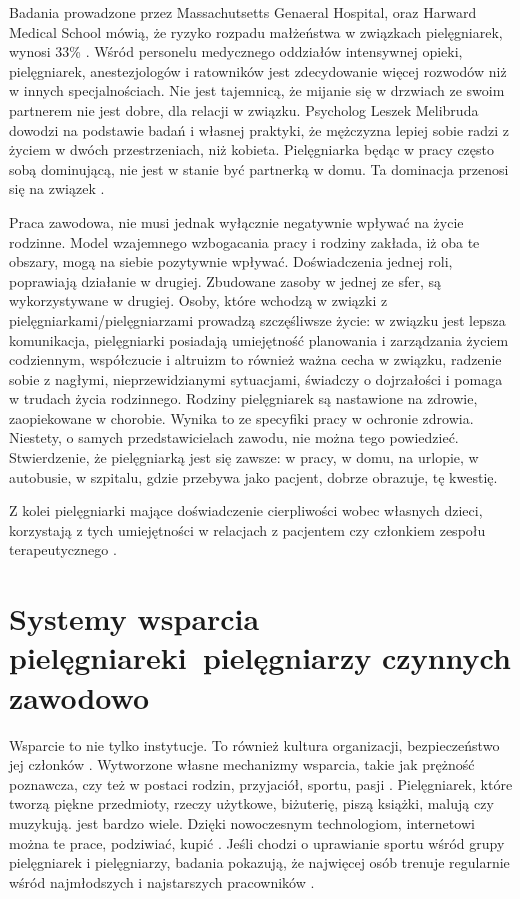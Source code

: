 \documentclass[a4paper,12pt,twoside,openright]{mwrep}
\begin{document}
Badania prowadzone przez Massachutsetts Genaeral Hospital, oraz Harward Medical School mówią, że ryzyko rozpadu małżeństwa w związkach pielęgniarek, wynosi 33\% \cite{rozwody}.  Wśród personelu medycznego oddziałów intensywnej opieki, pielęgniarek, anestezjologów i ratowników jest zdecydowanie więcej rozwodów niż w innych specjalnościach.  Nie jest tajemnicą, że mijanie się w drzwiach ze swoim partnerem nie jest dobre, dla relacji w związku. Psycholog Leszek Melibruda dowodzi na podstawie badań i własnej praktyki, że mężczyzna lepiej sobie radzi z życiem w dwóch przestrzeniach, niż kobieta. Pielęgniarka będąc w pracy często sobą dominującą, nie jest w stanie być partnerką w domu. Ta dominacja przenosi się na związek \cite{melibruda}.

Praca zawodowa, nie musi jednak wyłącznie negatywnie wpływać na życie rodzinne. Model wzajemnego wzbogacania pracy i rodziny zakłada, iż oba te obszary, mogą na siebie pozytywnie wpływać. Doświadczenia jednej roli, poprawiają działanie w drugiej. Zbudowane zasoby w jednej ze sfer, są wykorzystywane w drugiej.  Osoby, które wchodzą w związki z pielęgniarkami/pielęgniarzami prowadzą szczęśliwsze życie: w związku jest lepsza komunikacja, pielęgniarki posiadają umiejętność planowania i zarządzania życiem codziennym, współczucie i altruizm to również ważna cecha w związku, radzenie sobie z nagłymi, nieprzewidzianymi sytuacjami, świadczy o dojrzałości i pomaga w trudach życia rodzinnego. Rodziny pielęgniarek są nastawione na zdrowie, zaopiekowane w chorobie. Wynika to ze specyfiki pracy w ochronie zdrowia. Niestety, o samych przedstawicielach zawodu, nie można tego powiedzieć. Stwierdzenie, że pielęgniarką jest się zawsze: w pracy, w domu, na urlopie, w autobusie, w szpitalu, gdzie przebywa jako pacjent, dobrze obrazuje, tę kwestię.

Z kolei pielęgniarki mające doświadczenie cierpliwości wobec własnych dzieci, korzystają z tych umiejętności w relacjach z pacjentem czy członkiem zespołu terapeutycznego \cite{wzbogacanie}.

\section{Systemy wsparcia pielęgniarek\newline i~pielęgniarzy czynnych zawodowo}
\label{sectionSystemyWsparcia}
Wsparcie to nie tylko instytucje. To również kultura organizacji, bezpieczeństwo jej członków \cite{bezpieczenstwo}. Wytworzone własne mechanizmy wsparcia, takie jak  prężność poznawcza, czy też w postaci  rodzin, przyjaciół, sportu, pasji \cite{preznosc}. Pielęgniarek, które tworzą piękne przedmioty, rzeczy użytkowe, biżuterię, piszą książki, malują czy muzykują. jest bardzo wiele. Dzięki nowoczesnym technologiom, internetowi można te prace, podziwiać, kupić \cite{talent}. Jeśli chodzi o uprawianie sportu wśród grupy pielęgniarek i pielęgniarzy, badania pokazują, że najwięcej osób trenuje regularnie wśród najmłodszych i najstarszych pracowników \cite{sport}.
\end{document}
